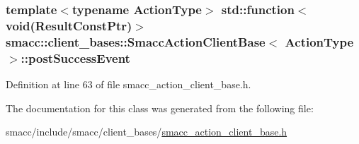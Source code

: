 \subsubsection[{\texorpdfstring{post\+Success\+Event}{postSuccessEvent}}]{\setlength{\rightskip}{0pt plus 5cm}template$<$typename Action\+Type$>$ std\+::function$<$void(Result\+Const\+Ptr)$>$ {\bf smacc\+::client\+\_\+bases\+::\+Smacc\+Action\+Client\+Base}$<$ Action\+Type $>$\+::post\+Success\+Event}\hypertarget{classsmacc_1_1client__bases_1_1SmaccActionClientBase_afb4f82508cd653d496392f321e84a783}{}\label{classsmacc_1_1client__bases_1_1SmaccActionClientBase_afb4f82508cd653d496392f321e84a783}


Definition at line 63 of file smacc\+\_\+action\+\_\+client\+\_\+base.\+h.



The documentation for this class was generated from the following file\+:\begin{DoxyCompactItemize}
\item 
smacc/include/smacc/client\+\_\+bases/\hyperlink{smacc__action__client__base_8h}{smacc\+\_\+action\+\_\+client\+\_\+base.\+h}\end{DoxyCompactItemize}
